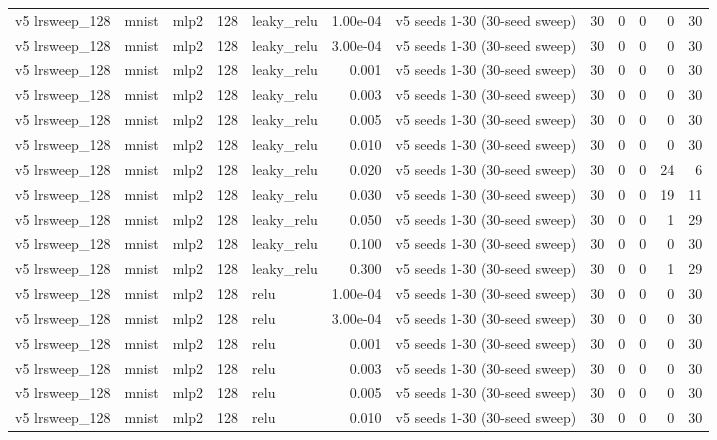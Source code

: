 \begin{table}[htbp]
{\begin{tabular}{@{}lllrlrlrrrrr@{}}
v5 lrsweep\_128 & mnist & mlp2 & 128 & leaky\_relu & 1.00e-04 & v5 seeds 1-30 (30-seed sweep) & 30 & 0 & 0 & 0 & 30 \\
v5 lrsweep\_128 & mnist & mlp2 & 128 & leaky\_relu & 3.00e-04 & v5 seeds 1-30 (30-seed sweep) & 30 & 0 & 0 & 0 & 30 \\
v5 lrsweep\_128 & mnist & mlp2 & 128 & leaky\_relu & 0.001 & v5 seeds 1-30 (30-seed sweep) & 30 & 0 & 0 & 0 & 30 \\
v5 lrsweep\_128 & mnist & mlp2 & 128 & leaky\_relu & 0.003 & v5 seeds 1-30 (30-seed sweep) & 30 & 0 & 0 & 0 & 30 \\
v5 lrsweep\_128 & mnist & mlp2 & 128 & leaky\_relu & 0.005 & v5 seeds 1-30 (30-seed sweep) & 30 & 0 & 0 & 0 & 30 \\
v5 lrsweep\_128 & mnist & mlp2 & 128 & leaky\_relu & 0.010 & v5 seeds 1-30 (30-seed sweep) & 30 & 0 & 0 & 0 & 30 \\
v5 lrsweep\_128 & mnist & mlp2 & 128 & leaky\_relu & 0.020 & v5 seeds 1-30 (30-seed sweep) & 30 & 0 & 0 & 24 & 6 \\
v5 lrsweep\_128 & mnist & mlp2 & 128 & leaky\_relu & 0.030 & v5 seeds 1-30 (30-seed sweep) & 30 & 0 & 0 & 19 & 11 \\
v5 lrsweep\_128 & mnist & mlp2 & 128 & leaky\_relu & 0.050 & v5 seeds 1-30 (30-seed sweep) & 30 & 0 & 0 & 1 & 29 \\
v5 lrsweep\_128 & mnist & mlp2 & 128 & leaky\_relu & 0.100 & v5 seeds 1-30 (30-seed sweep) & 30 & 0 & 0 & 0 & 30 \\
v5 lrsweep\_128 & mnist & mlp2 & 128 & leaky\_relu & 0.300 & v5 seeds 1-30 (30-seed sweep) & 30 & 0 & 0 & 1 & 29 \\
v5 lrsweep\_128 & mnist & mlp2 & 128 & relu & 1.00e-04 & v5 seeds 1-30 (30-seed sweep) & 30 & 0 & 0 & 0 & 30 \\
v5 lrsweep\_128 & mnist & mlp2 & 128 & relu & 3.00e-04 & v5 seeds 1-30 (30-seed sweep) & 30 & 0 & 0 & 0 & 30 \\
v5 lrsweep\_128 & mnist & mlp2 & 128 & relu & 0.001 & v5 seeds 1-30 (30-seed sweep) & 30 & 0 & 0 & 0 & 30 \\
v5 lrsweep\_128 & mnist & mlp2 & 128 & relu & 0.003 & v5 seeds 1-30 (30-seed sweep) & 30 & 0 & 0 & 0 & 30 \\
v5 lrsweep\_128 & mnist & mlp2 & 128 & relu & 0.005 & v5 seeds 1-30 (30-seed sweep) & 30 & 0 & 0 & 0 & 30 \\
v5 lrsweep\_128 & mnist & mlp2 & 128 & relu & 0.010 & v5 seeds 1-30 (30-seed sweep) & 30 & 0 & 0 & 0 & 30 \\

\end{tabular}}
\end{table}
